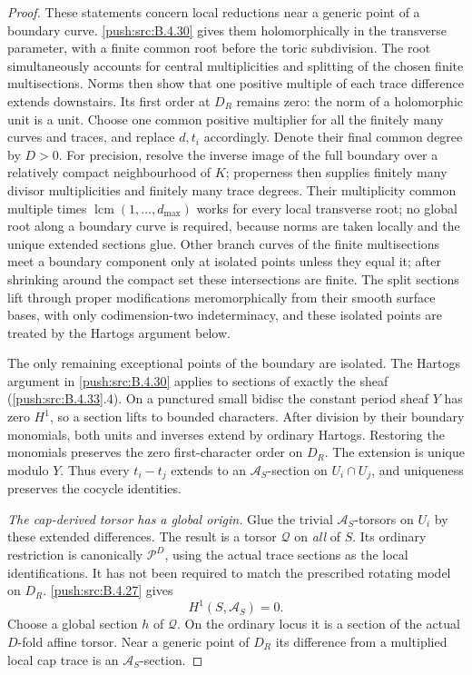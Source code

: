 \begin{proof}
These statements concern local reductions
near a generic point of a boundary curve.
\ref{push:src:B.4.30} gives them holomorphically in the
transverse parameter, with a finite
common root before the toric subdivision.
The root simultaneously accounts for
central multiplicities and splitting of
the chosen finite multisections. Norms
then show that one positive multiple of
each trace difference extends downstairs.
Its first order at $D_R$ remains zero:
the norm of a holomorphic unit is a unit.
Choose one common positive multiplier
for all the finitely many curves and
traces, and replace $d,t_i$ accordingly.
Denote their final common degree by $D>0$.
For precision, resolve the inverse image
of the full boundary over a relatively
compact neighbourhood of $K$; properness
then supplies finitely many divisor
multiplicities and finitely many trace
degrees. Their multiplicity common multiple
times $\operatorname{lcm}(1,\ldots,d_{\max})$
works for every local transverse root;
no global root along a boundary curve
is required, because norms are taken
locally and the unique extended sections
glue. Other branch curves of the finite
multisections meet a boundary component
only at isolated points unless they
equal it; after shrinking around the
compact set these intersections are
finite. The split sections lift through
proper modifications meromorphically from
their smooth surface bases, with only
codimension-two indeterminacy, and these
isolated points are treated by the
Hartogs argument below.

The only remaining exceptional points of
the boundary are isolated. The Hartogs
argument in \ref{push:src:B.4.30} applies to sections
of exactly the sheaf (\ref{push:src:B.4.33}.4). On a
punctured small bidisc the constant
period sheaf $Y$ has zero $H^1$, so a
section lifts to bounded characters.
After division by their boundary monomials,
both units and inverses extend by ordinary
Hartogs. Restoring the monomials preserves
the zero first-character order on $D_R$.
The extension is unique modulo $Y$.
Thus every $t_i-t_j$ extends to an
$\mathcal A_S$-section on $U_i\cap U_j$,
and uniqueness preserves the cocycle
identities.

\emph{The cap-derived torsor has a global origin.}
Glue the trivial $\mathcal A_S$-torsors
on $U_i$ by these extended differences.
The result is a torsor $\mathcal Q$ on
\emph{all} of $S$. Its ordinary restriction
is canonically $\mathscr P^D$, using
the actual trace sections as the local
identifications. It has not been required
to match the prescribed rotating model
on $D_R$. \ref{push:src:B.4.27} gives
\[
 H^1(S,\mathcal A_S)=0.
 \tag{B.4.33.6}
\]
Choose a global section $h$ of $\mathcal Q$.
On the ordinary locus it is a section
of the actual $D$-fold affine torsor.
Near a generic point of $D_R$ its
difference from a multiplied local cap
trace is an $\mathcal A_S$-section.


\end{proof}
